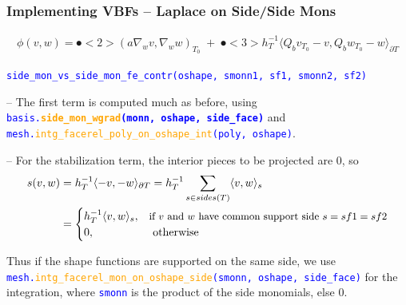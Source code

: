\documentclass[compress]{beamer}
\begin{document}
\begin{frame}
  \frametitle{Implementing VBFs -- Laplace on Side/Side Mons}
  \vspace{-0.5cm}
  \begin{align*}
    \mathfrak \phi(v,w) = \spot<2>{(a \nabla_w v,\nabla_w w)_{\scriptscriptstyle T_0}} \;+\;
    \spot<3>{h_T^{-1}\langle Q_b v_{\scriptscriptstyle T_0} - v,Q_b w_{\scriptscriptstyle T_0} - w \rangle_{\partial T}}
  \end{align*}
  
  \texttt{\small \textcolor{blue}{side\_mon\_vs\_side\_mon\_fe\_contr(oshape, smonn1, sf1, smonn2, sf2)}}\\
  \vspace{.3cm}
  
  \pause
  \uncover<+-> {
  -- The first term is computed much as before, using  
     {\small \texttt{\textcolor{blue}{basis.\textbf{\textcolor{orange}{side\_mon\_wgrad}(monn, oshape, side\_face)}}}} and \\
     \texttt{\small \textcolor{blue}{mesh.\textcolor{orange}{intg\_facerel\_poly\_on\_oshape\_int}(poly, oshape)}}.\\
  
  \vspace{.1cm}
  \uncover<+-> {
  -- For the stabilization term, the interior pieces to be projected are 0, so 
  \begin{align*}
    s(v,w) &= h_T^{-1} \langle -v, -w \rangle_{\partial T} = h_T^{-1} \sum_{s \in sides(T)} \langle v, w \rangle_s\\
           &= 
        \begin{cases}
          h_T^{-1} \langle v, w \rangle_s, &\mbox{\small if $v$ and $w$ have common support side $s=sf1=sf2$}\\
          0, &\mbox{ otherwise}
        \end{cases}
  \end{align*}
  
  \vspace{.1cm}
  \uncover<+-> {
    Thus if the shape functions are supported on the same side, we use
    \texttt{\scriptsize \textcolor{blue}{mesh.\textcolor{orange}{intg\_facerel\_mon\_on\_oshape\_side}(smonn, oshape, side\_face)}}
    for the integration, where \texttt{\small \textcolor{blue}{smonn}} is the product of the side monomials, else $0$.
  }}}
\end{frame}
\end{document}
